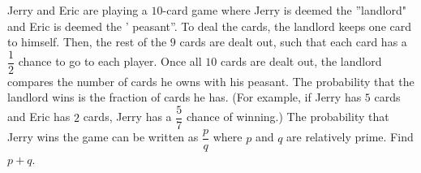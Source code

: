 Jerry and Eric are playing a $10$-card game where Jerry is deemed the ''landlord" and Eric is deemed the ' peasant''. To deal the cards, the landlord keeps one card to himself. Then, the rest of the $9$ cards are dealt out, such that each card has a $\dfrac{1}{2}$ chance to go to each player. Once all $10$ cards are dealt out, the landlord compares the number of cards he owns with his peasant. The probability that the landlord wins is the fraction of cards he has. (For example, if Jerry has $5$ cards and Eric has $2$ cards, Jerry has a $\dfrac{5}{7}$ chance of winning.) The probability that Jerry wins the game can be written as $\dfrac{p}{q}$ where $p$ and $q$ are relatively prime. Find $p + q$.
